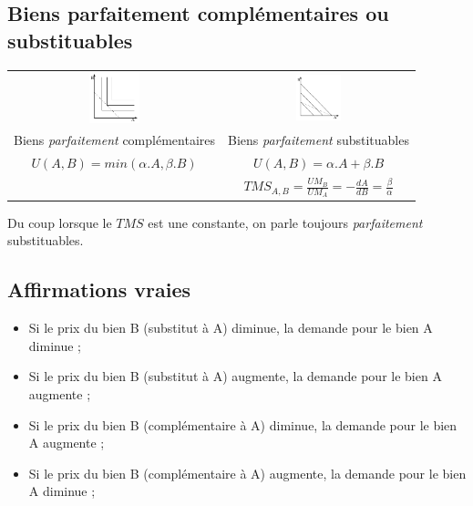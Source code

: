 \subsection{Biens parfaitement complémentaires ou substituables}
\begin{center}
	\begin{tabular}{cc}
		\includegraphics[width=0.25\textwidth]{images/graph_biens_parfaitement_complementaires.pdf}&
		\includegraphics[width=0.25\textwidth]{images/graph_biens_parfaitement_substituables.pdf}\\
		
		Biens \textit{parfaitement} complémentaires &
		Biens \textit{parfaitement} substituables\\
		
		$U(A,B)=min(\alpha .A,\beta .B)$ &
		$U(A,B)=\alpha .A + \beta .B$\\
		
		&
		$TMS_{A,B}=\frac{UM_B}{UM_A}=-\frac{dA}{dB}=\frac{\beta}{\alpha}$
	\end{tabular}
\end{center}
Du coup lorsque le $TMS$ est une constante, on parle toujours \textit{parfaitement} substituables.



\subsection{Affirmations vraies}
\begin{itemize}
	\item Si le prix du bien B (substitut à A) diminue, la demande pour le bien A diminue ;
	\item Si le prix du bien B (substitut à A) augmente, la demande pour le bien A augmente ;
	\item Si le prix du bien B (complémentaire à A) diminue, la demande pour le bien A augmente ;
	\item Si le prix du bien B (complémentaire à A) augmente, la demande pour le bien A diminue ;
\end{itemize}